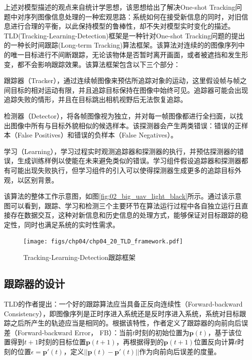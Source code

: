 上述对模型描述的观点来自统计学思想，该思想给出了解决One-shot Tracking问题中对序列图像信息处理的一种宏观思路：系统如何在接受新信息的同时，对旧信息进行合理的平衡，以此保持模型的鲁棒性，却不失对模型实时变化的描述。TLD(Tracking-Learning-Detection)\cite{kalal2012tracking}框架是一种针对One-shot Tracking问题的提出的一种长时间跟踪(Long-term Tracking)算法框架。该算法对连续的的图像序列中的唯一目标进行不间断跟踪，无论该物体是否暂时离开画面，或者被遮挡和发生形变，都不会影响跟踪效果。该算法框架包含以下三个部分：
\begin{compactenum}
	\item 跟踪器（Tracker），通过连续帧图像来预估所追踪对象的运动，这里假设帧与帧之间目标的相对运动有限，并且追踪目标保持在图像中始终可见。追踪器可能会出现追踪失败的情形，并且在目标跳出相机视野后无法恢复追踪。
	\item 检测器（Detector），将各帧图像视为独立，并对每一帧图像都进行全扫面，以找出图像中所有与目标外貌相似的候选样本。该探测器会产生两类错误：错误的正样本（False Positives）和错误的负样本（False Negatives）。
	\item 学习（Learning），学习过程实时观测追踪器和探测器的执行，并预估探测器的错误，生成训练样例以使能在未来避免类似的错误。学习组件假设追踪器和探测器都有可能出现失败执行，但学习组件的引入可以使得探测器生成更多的追踪目标外观，以区别背景。
\end{compactenum}

该算法的整体工作示意图，如图\ref{fig:02_big_uav_light_black}所示\cite{kalal2012tracking}。通过该示意图可以看到，跟踪、学习和检测三个主要环节在算法运行过程中各自独立运行且直接存在数据交互，这种对新信息和历史信息的处理方式，能够保证对目标跟踪的稳定性，同时也满足系统的实时性需求。

\begin{figure}[ht]   
	\centering
	\texttt{[image: figs/chp04/chp04\_20\_TLD\_framework.pdf]}
	\caption{Tracking-Learning-Detection跟踪框架}
	\label{fig:chp04_20_TLD_framework}
\end{figure}


\subsection{跟踪器的设计}
TLD的作者提出：一个好的跟踪算法应当具备正反向连续性（Forward-backward Consistency）\cite{kalal2010forward}，即图像序列是正时序进入系统还是反时序进入系统，系统对目标跟踪之后所产生的轨迹应当是相同的。根据该特性，作者定义了跟踪器的向前向后误差（Forward-backward Error， FB）：当前$t$时刻的初始位置为$\mathbf{p}(t)$，基于该位置得到$t+1$时刻的目标位置$\mathbf{p}(t+1)$，再根据得到的$\mathbf{p}(t+1)$位置反向计算$t$时刻的位置$\epsilon = \mathbf{p}'(t)$，定义$||\mathbf{p}(t)-\mathbf{p}'(t)||$作为向前向后误差的度量。

